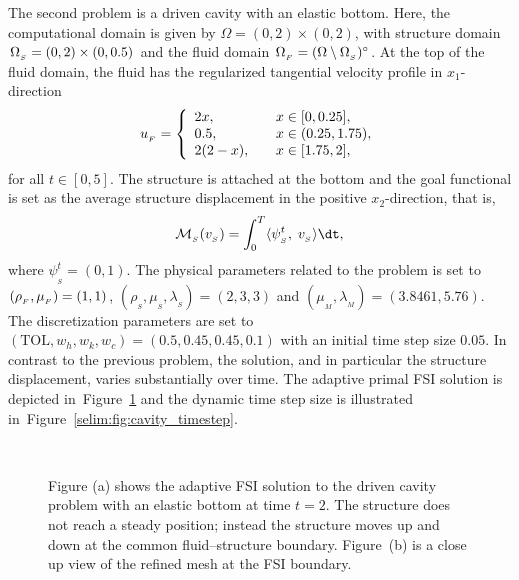 The second problem is a driven cavity with an elastic bottom. Here,
the computational domain is given by $\Omega = (0,2)\times (0,2)$,
with structure domain $\Omega_{_{S}} = (0, 2)\times (0, 0.5)$ and the fluid
domain $\Omega_{_{F}} = (\Omega\setminus \Omega_{_{S}})^{\circ}$. At the top of the fluid
domain, the fluid has the regularized tangential velocity profile in
$x_1$-direction
\begin{equation}
u_{_{F}} =
\left\{
\begin{array}{lcl}
2x,& &x\in[0, 0.25],\\
0.5,& &x\in(0.25 ,1.75),\\
2(2-x),&  &x\in[1.75, 2],
\end{array}
\right.
\end{equation}
for all $t \in [0,5]$. The structure is attached at the bottom and the
goal functional is set as the average structure displacement in the positive
$x_2$-direction, that is,
\begin{equation}
\label{selim:eq:goalfunctional_cavity}
\M_{_{S}}(v_{_{S}}) = \int_0^T \langle \psi^t_{_{S}},\; v_{_{S}}\rangle \dt,
\end{equation}
where $\psi^t_{_{S}}=(0,1)$.  The physical parameters related to the
problem is set to $(\rho_{_{F}},\mu_{_{F}}) = (1, 1)$,
$(\rho_{_{S}},\mu_{_{S}}, \lambda_{_{S}}) = (2, 3, 3)$ and
$(\mu_{_{M}}, \lambda_{_{M}}) = (3.8461, 5.76)$. The discretization
parameters are set to $(\mathrm{TOL}, w_h, w_k,w_c) = (0.5, 0.45,
0.45, 0.1)$ with an initial time step size $0.05$.  In contrast to the
previous problem, the solution, and in particular the structure
displacement, varies substantially over time. The adaptive primal FSI
solution is depicted in~Figure~\ref{selim:fig:primal_cavity} and the
dynamic time step size is illustrated
in~Figure~\ref{selim:fig:cavity_timestep}.
\begin{figure}[tbp!]
\begin{center}
   \\
\end{center}
\caption{Figure (a) shows the adaptive FSI solution to the driven
  cavity problem with an elastic bottom at time $t=2$. The structure
  does not reach a steady position; instead the structure moves up and
  down at the common fluid--structure boundary. Figure~(b) is a close
  up view of the refined mesh at the FSI boundary.}
\label{selim:fig:primal_cavity}
\end{figure}

